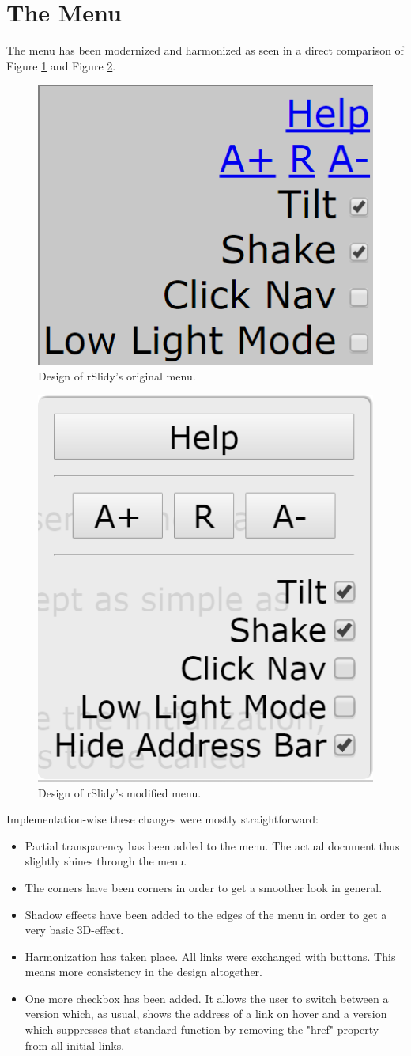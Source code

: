 \section{The Menu}
The menu has been modernized and harmonized as seen in a direct comparison of Figure \ref{fig:menuOLD} and Figure \ref{fig:menuNEW}.

\begin{figure}[tp]
	\centering
	\includegraphics[width = .4\textwidth]{images/menu_old.png}
	
	\caption[Original Menu]{
		Design of rSlidy's original menu.
	}
	\label{fig:menuOLD}
\end{figure}

\begin{figure}[tp]
	\centering
	\includegraphics[width = .4\textwidth]{images/menu_new.png}
	
	\caption[Modified Menu]{
		Design of rSlidy's modified menu.
	}
	\label{fig:menuNEW}
\end{figure}

Implementation-wise these changes were mostly straightforward:
\begin{itemize}
	\item Partial transparency has been added to the menu. The actual document thus slightly shines through the menu.
	\item The corners have been corners in order to get a smoother look in general.
	\item Shadow effects have been added to the edges of the menu in order to get a very basic 3D-effect.
	\item Harmonization has taken place. All links were exchanged with buttons. This means more consistency in the design altogether. 
	\item One more checkbox has been added. It allows the user to switch between a version which, as usual, shows the address of a link on hover and a version which suppresses that standard function by removing the "href" property from all initial links.
\end{itemize}


